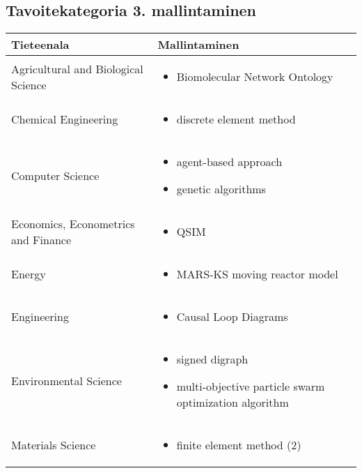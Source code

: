 \documentclass[utf8]{gradu3}
\begin{document}
\subsection{Tavoitekategoria 3. mallintaminen}

\begin{longtable}[h]{|p{5cm}|p{8cm}|}
    \hline
    \textbf{Tieteenala}    &    \textbf{Mallintaminen}\\
    \hline
    Agricultural and Biological Science & \begin{itemize}
        \item Biomolecular Network Ontology
    \end{itemize} \\
    \hline
    Chemical Engineering & \begin{itemize}
        \item discrete element method
    \end{itemize} \\
    \hline
    Computer Science & \begin{itemize}
        \item agent-based approach
        \item genetic algorithms
    \end{itemize} \\
    \hline
    Economics, Econometrics and Finance & \begin{itemize}
        \item QSIM
    \end{itemize} \\
    \hline
    Energy & \begin{itemize}
        \item MARS-KS moving reactor model
    \end{itemize} \\
    \hline
    Engineering & \begin{itemize}
        \item Causal Loop Diagrams
    \end{itemize} \\
    \hline
    Environmental Science & \begin{itemize}
        \item signed digraph
        \item multi-objective particle swarm optimization algorithm
    \end{itemize} \\
    \hline
    Materials Science & \begin{itemize}
        \item finite element method (2)

\end{itemize}
\end{longtable}
\end{document}
